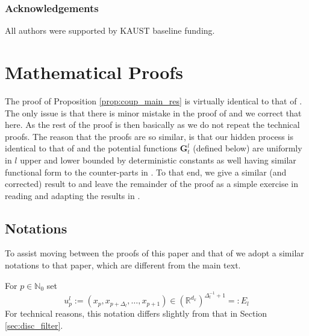 \documentclass[english]{article}
\begin{document}



\subsubsection*{Acknowledgements}

All authors were supported by KAUST baseline funding.

\appendix

\section{Mathematical Proofs}

The proof of Proposition \ref{prop:coup_main_res} is virtually identical to that of \cite[Theorem 4.1]{jasra}.
The only issue is that there is minor mistake in the proof of \cite[Lemma A.1.]{jasra} and we correct that here. As the rest  of the proof is then basically as \cite[Theorem 4.1]{jasra} we do not repeat the technical proofs. The reason that the proofs are so similar, is that our hidden process is identical to that of \cite{jasra} and the potential functions $\mathbf{G}_t^l$ (defined below) are uniformly in $l$ upper and lower bounded by deterministic constants as well having similar functional form to the counter-parts in \cite{jasra}. To that end, we give a similar (and corrected) result to \cite[Lemma A.1.]{jasra} and leave the remainder of the proof as a simple exercise in reading and adapting the results in \cite{jasra}.

\subsection{Notations}

To assist moving between the proofs of this paper and that of \cite{jasra} we adopt a similar notations to that paper, which are different from the main text.

For $p\in\mathbb{N}_0$ set
$$
u_p^l := (x_{p},x_{p+\Delta_l},\dots,x_{p+1}) \in (\mathbb{R}^{d_x})^{\Delta_l^{-1}+1} =: E_l
$$
For technical reasons, this notation differs slightly from that in Section \ref{sec:disc_filter}.
  
\end{document}
